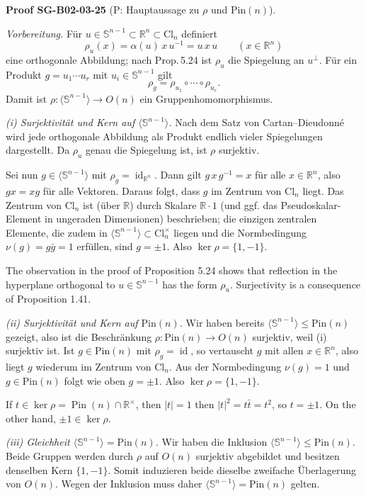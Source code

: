 \documentclass[10pt, letterpaper]{article}
\newcommand{\id}{\operatorname{id}}
\newcommand{\R}{\mathbb{R}}
\newcommand{\Cl}{\mathrm{Cl}}
\newcommand{\Pin}{\mathrm{Pin}}
\newcommand{\CustomHeading}[3]{%
  \par\medskip\noindent%
  \textbf{#1 #2} \textnormal{(#3)}.\enskip%
}
\newenvironment{PROOF}[2]{\begin{unitbox}\CustomHeading{Proof}{#1}{#2}}{\end{unitbox}}
\begin{document}
\begin{PROOF}{SG-B02-03-25}{P: Hauptaussage zu \(\rho\) und \(\Pin(n)\)}
\emph{Vorbereitung.} Für \(u\in\mathbb S^{n-1}\subset\R^n\subset\Cl_n\) definiert
\[
\rho_u(x)=\alpha(u)\,x\,u^{-1}=u\,x\,u \qquad (x\in\R^n)
\]
eine orthogonale Abbildung; nach Prop.\,5.24 ist \(\rho_u\) die Spiegelung an \(u^\perp\).
Für ein Produkt \(g=u_1\cdots u_r\) mit \(u_i\in\mathbb S^{n-1}\) gilt
\[
\rho_g=\rho_{u_1}\circ\cdots\circ\rho_{u_r}.
\]
Damit ist \(\rho:\langle\mathbb S^{n-1}\rangle\to O(n)\) ein Gruppenhomomorphismus.

\smallskip
\emph{(i) Surjektivität und Kern auf \(\langle\mathbb S^{n-1}\rangle\).}
Nach dem Satz von Cartan–Dieudonné wird jede orthogonale Abbildung als Produkt
endlich vieler Spiegelungen dargestellt. Da \(\rho_{u}\) genau die Spiegelung ist,
ist \(\rho\) surjektiv.

Sei nun \(g\in\langle\mathbb S^{n-1}\rangle\) mit \(\rho_g=\id_{\R^n}\).
Dann gilt \(g\,x\,g^{-1}=x\) für alle \(x\in\R^n\), also \(gx=xg\) für alle Vektoren.
Daraus folgt, dass \(g\) im Zentrum von \(\Cl_n\) liegt. Das Zentrum von \(\Cl_n\)
ist (über \(\R\)) durch Skalare \(\R\cdot 1\) (und ggf. das Pseudoskalar-Element in
ungeraden Dimensionen) beschrieben; die einzigen zentralen Elemente, die zudem in
\(\langle\mathbb S^{n-1}\rangle\subset \Cl_n^\times\) liegen und die Normbedingung
\(\nu(g)=g\bar g=1\) erfüllen, sind \(g=\pm 1\).
Also \(\ker\rho=\{1,-1\}\).

The observation in the proof of Proposition 5.24 shows that reflection in the hyperplane orthogonal to $u \in \mathbb{S}^{n-1}$ has the form $\rho_{u}$. Surjectivity is a consequence of Proposition 1.41.

\smallskip
\emph{(ii) Surjektivität und Kern auf \(\Pin(n)\).}
Wir haben bereits \(\langle\mathbb S^{n-1}\rangle\le \Pin(n)\) gezeigt, also ist die
Beschränkung \(\rho:\Pin(n)\to O(n)\) surjektiv, weil (i) surjektiv ist.
Ist \(g\in\Pin(n)\) mit \(\rho_g=\id\), so vertauscht \(g\) mit allen
\(x\in\R^n\), also liegt \(g\) wiederum im Zentrum von \(\Cl_n\).
Aus der Normbedingung \(\nu(g)=1\) und \(g\in\Pin(n)\) folgt wie oben \(g=\pm 1\).
Also \(\ker\rho=\{1,-1\}\).

If $t \in \operatorname{ker} \rho=\operatorname{Pin}(n) \cap \mathbb{R}^{\times}$, then $|t|=1$ then $|t|^{2}=t \bar{t}=t^{2}$, so $t= \pm 1$. On the other hand, $\pm 1 \in \operatorname{ker} \rho$.

\smallskip
\emph{(iii) Gleichheit \(\langle\mathbb S^{n-1}\rangle=\Pin(n)\).}
Wir haben die Inklusion \(\langle\mathbb S^{n-1}\rangle\le \Pin(n)\).
Beide Gruppen werden durch \(\rho\) auf \(O(n)\) surjektiv abgebildet und besitzen
denselben Kern \(\{1,-1\}\). Somit induzieren beide dieselbe zweifache Überlagerung
von \(O(n)\). Wegen der Inklusion muss daher \(\langle\mathbb S^{n-1}\rangle=\Pin(n)\) gelten.


\end{PROOF}
\end{document}
